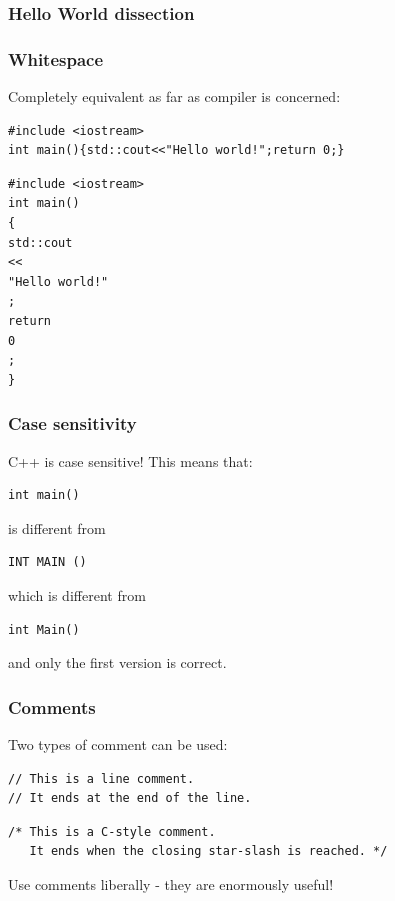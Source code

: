 \documentclass{beamer}
\begin{document}
\begin{frame}[fragile]
  \frametitle{Hello World dissection}
  \begin{semiverbatim}
  \end{semiverbatim}
\end{frame}

\begin{frame}[fragile]
  \frametitle{Whitespace}
  \pause
  
  Completely equivalent as far as compiler is concerned:
  \begin{lstlisting}
#include <iostream>
int main(){std::cout<<"Hello world!";return 0;}
  \end{lstlisting}
  \begin{lstlisting}
#include <iostream>
int main()
{
std::cout
<<
"Hello world!"
;
return
0
;
}  \end{lstlisting}
\end{frame}

\begin{frame}[fragile]
  \frametitle{Case sensitivity}
  C++ is case sensitive!  This means that:
  \begin{lstlisting}
int main()
  \end{lstlisting}
  is different from
  \begin{lstlisting}
INT MAIN ()
  \end{lstlisting}
  which is different from
  \begin{lstlisting}
int Main()
  \end{lstlisting}
  and only the first version is correct.
\end{frame}

\begin{frame}[fragile]
  \frametitle{Comments}
  Two types of comment can be used:
  \begin{lstlisting}
// This is a line comment.
// It ends at the end of the line.
  \end{lstlisting}
  \begin{lstlisting}
/* This is a C-style comment.
   It ends when the closing star-slash is reached. */
  \end{lstlisting}
    Use comments liberally - they are enormously useful!
\end{frame}
\end{document}
